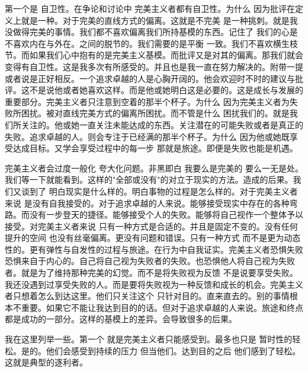第一个是 自卫性。在争论和讨论中 完美主义者都有自卫性。为什么 因为批评在定义上就是一种。对于完美的直线方式的偏离。这就是不完美 是一种挑刺。就是我没做得完美的事情。我们都不喜欢偏离我们所持基模的东西。记住了 我们的心是不喜欢内在与外在。之间的脱节的。我们需要的是平衡 一致。我们不喜欢横生枝节。而如果我们心中抱有的是完美主义基模。而批评又是对其的偏离。那我们就会变得有自卫性。这是我多次有所感受的。并且也是我一直在努力解决的。附带一提 或者说是正好相反。一个追求卓越的人是心胸开阔的。他会欢迎时不时的建议与批评。这不是说他或者她喜欢这样。而是他或她明白这是必要的。这是成长与发展的重要部分。完美主义者只注意到空着的那半个杯子。为什么 因为完美主义者为失败所困扰。被对直线完美方式的偏离所困扰。而不管是什么 困扰我们的。就是我们所关注的。他或她一直关注未能达成的东西。关注潜在的可能失败或者是真正的失败。追求卓越的人。则会专注于已经满的那半个杯子。为什么 因为他或她既享受达成目标。又学会享受过程中的每一步 那就是旅途。即便是失败也能是机遇。 

完美主义者会过度一般化 夸大化问题。非黑即白 我要么是完美的 要么一无是处。我们等一下就能看到。这样的"全部或没有"的对立于现实的方法。造成的后果。我们又谈到了 明白现实是什么样的。明白事物的过程是怎么样的。对于完美主义者来说 是没有自我接受的。对于追求卓越的人来说。能够接受现实中存在的各种弯路。而没有一步登天的捷径。能够接受个人的失败。能够将自己视作一个整体予以接受。对完美主义者来说 只有一种方式是合适的。并且是固定不变的。没有任何提升的空间 也没有丝毫偏离。更没有问题和错误。只有一种方式 而不是更为动态性的。更有弹性与自发性的过程与旅途。在行为中自我证实。完美主义者恐惧失败 恐惧来自于内心的。自己将自己视为失败者的失败。也恐惧他人将自己视为失败者。就是为了维持那种完美的幻觉。而不是将失败视为反馈 不是说要享受失败。我还没遇到过享受失败的人。而是要将失败视为一种反馈和成长的机会。完美主义者只想着怎么到达这里。他们只关注这个 只针对目的。直来直去的。别的事情根本不重要。如果它不能让我达到目的的话。但对于追求卓越的人来说。旅途和终点都是成功的一部分。这样的基模上的差异。会导致很多的后果。 

我在这里列举一些。第一个 就是完美主义者只能感受到。最多也只是 暂时性的轻松。是的。他们会感受到持续的压力 但当他们。达到目的之后 他们感到了轻松。这就是典型的逐利者。 

